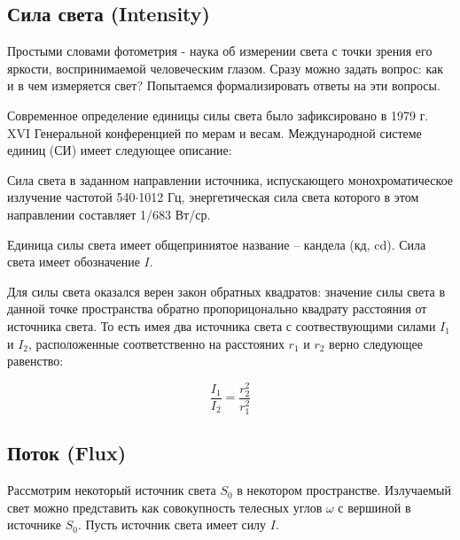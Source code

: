 \documentclass[12pt]{article}
\begin{document}
\newpage

\subsection{Сила света (Intensity)}

Простыми словами фотометрия - наука об измерении света с точки
зрения его яркости, воспринимаемой человеческим глазом.
Сразу можно задать вопрос: как и в чем измеряется
свет? Попытаемся формализировать ответы на эти вопросы.

Современное определение единицы силы света было зафиксировано в 1979 г.
XVI Генеральной конференцией по мерам и весам. Международной системе единиц (СИ)
имеет следующее описание:

\begin{displayquote}
  Сила света в заданном направлении источника, испускающего
  монохроматическое излучение частотой 540$\cdot$1012 Гц, энергетическая сила света
  которого в этом направлении составляет 1/683 Вт/ср.
\end{displayquote}

Единица силы света имеет общеприниятое название -- кандела (кд, cd).
Сила света имеет обозначение $I$.

Для силы света оказался верен закон обратных квадратов: значение силы света в
данной точке пространства обратно пропорицонально квадрату расстояния от источника света.
То есть имея два источника света с соотвествующими силами $I_1$ и $I_2$, расположенные
соответственно на расстояних $r_1$ и $r_2$ верно следующее равенство:

\begin{equation} \label{inverse_law}
  \frac{I_1}{I_2} = \frac{r_2^2}{r_1^2}
\end{equation}

\subsection{Поток (Flux)}

Рассмотрим некоторый источник света $S_0$ в некотором пространстве.
Излучаемый свет можно представить как совокупность телесных углов $\omega$ с вершиной
в источнике $S_0$. Пусть источник света имеет силу $I$.
\end{document}
